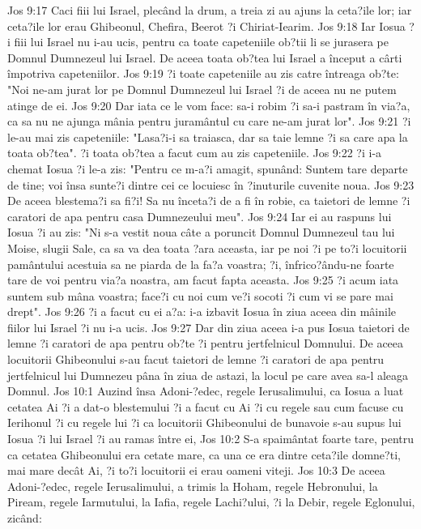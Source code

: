 Jos 9:17  Caci fiii lui Israel, plecând la drum, a treia zi au ajuns la ceta?ile lor; iar ceta?ile lor erau Ghibeonul, Chefira, Beerot ?i Chiriat-Iearim.
Jos 9:18  Iar Iosua ?i fiii lui Israel nu i-au ucis, pentru ca toate capeteniile ob?tii li se jurasera pe Domnul Dumnezeul lui Israel. De aceea toata ob?tea lui Israel a început a cârti împotriva capeteniilor.
Jos 9:19  ?i toate capeteniile au zis catre întreaga ob?te: "Noi ne-am jurat lor pe Domnul Dumnezeul lui Israel ?i de aceea nu ne putem atinge de ei.
Jos 9:20  Dar iata ce le vom face: sa-i robim ?i sa-i pastram în via?a, ca sa nu ne ajunga mânia pentru juramântul cu care ne-am jurat lor".
Jos 9:21  ?i le-au mai zis capeteniile: "Lasa?i-i sa traiasca, dar sa taie lemne ?i sa care apa la toata ob?tea". ?i toata ob?tea a facut cum au zis capeteniile.
Jos 9:22  ?i i-a chemat Iosua ?i le-a zis: "Pentru ce m-a?i amagit, spunând: Suntem tare departe de tine; voi însa sunte?i dintre cei ce locuiesc în ?inuturile cuvenite noua.
Jos 9:23  De aceea blestema?i sa fi?i! Sa nu înceta?i de a fi în robie, ca taietori de lemne ?i caratori de apa pentru casa Dumnezeului meu".
Jos 9:24  Iar ei au raspuns lui Iosua ?i au zis: "Ni s-a vestit noua câte a poruncit Domnul Dumnezeul tau lui Moise, slugii Sale, ca sa va dea toata ?ara aceasta, iar pe noi ?i pe to?i locuitorii pamântului acestuia sa ne piarda de la fa?a voastra; ?i, înfrico?ându-ne foarte tare de voi pentru via?a noastra, am facut fapta aceasta.
Jos 9:25  ?i acum iata suntem sub mâna voastra; face?i cu noi cum ve?i socoti ?i cum vi se pare mai drept".
Jos 9:26  ?i a facut cu ei a?a: i-a izbavit Iosua în ziua aceea din mâinile fiilor lui Israel ?i nu i-a ucis.
Jos 9:27  Dar din ziua aceea i-a pus Iosua taietori de lemne ?i caratori de apa pentru ob?te ?i pentru jertfelnicul Domnului. De aceea locuitorii Ghibeonului s-au facut taietori de lemne ?i caratori de apa pentru jertfelnicul lui Dumnezeu pâna în ziua de astazi, la locul pe care avea sa-l aleaga Domnul.
Jos 10:1  Auzind însa Adoni-?edec, regele Ierusalimului, ca Iosua a luat cetatea Ai ?i a dat-o blestemului ?i a facut cu Ai ?i cu regele sau cum facuse cu Ierihonul ?i cu regele lui ?i ca locuitorii Ghibeonului de bunavoie s-au supus lui Iosua ?i lui Israel ?i au ramas între ei,
Jos 10:2  S-a spaimântat foarte tare, pentru ca cetatea Ghibeonului era cetate mare, ca una ce era dintre ceta?ile domne?ti, mai mare decât Ai, ?i to?i locuitorii ei erau oameni viteji.
Jos 10:3  De aceea Adoni-?edec, regele Ierusalimului, a trimis la Hoham, regele Hebronului, la Piream, regele Iarmutului, la Iafia, regele Lachi?ului, ?i la Debir, regele Eglonului, zicând:

